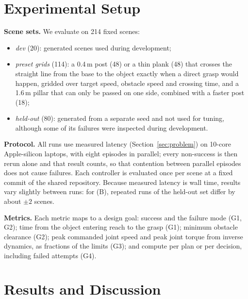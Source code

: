\documentclass[conference]{IEEEtran}
\begin{document}
\section{Experimental Setup}
\label{sec:setup}

\textbf{Scene sets.} We evaluate on 214 fixed scenes:
\begin{itemize}
  \item \emph{dev} (20): generated scenes used during development;
  \item \emph{preset grids} (114): a 0.4\,m post (48) or a thin plank (48) that crosses the straight line
    from the base to the object exactly when a direct grasp would happen, gridded over target speed,
    obstacle speed and crossing time, and a 1.6\,m pillar that can only be passed on one side, combined with a
    faster post (18);
  \item \emph{held-out} (80): generated from a separate seed and not used for tuning, although some of its
    failures were inspected during development.
\end{itemize}

\textbf{Protocol.} All runs use measured latency (Section~\ref{sec:problem}) on 10-core Apple-silicon
laptops, with eight episodes in parallel; every non-success is then rerun alone and that result counts,
so that contention between parallel episodes does not cause failures. Each controller is evaluated once
per scene at a fixed commit of the shared repository. Because measured latency is wall time, results vary
slightly between runs: for (B), repeated runs of the held-out set differ by about $\pm2$ scenes.

\textbf{Metrics.} Each metric maps to a design goal: success and the failure mode (G1, G2); time from
the object entering reach to the grasp (G1); minimum obstacle clearance (G2); peak commanded joint speed
and peak joint torque from inverse dynamics, as fractions of the limits (G3); and compute per plan or per
decision, including failed attempts (G4).

\section{Results and Discussion}
\label{sec:results}
\end{document}
